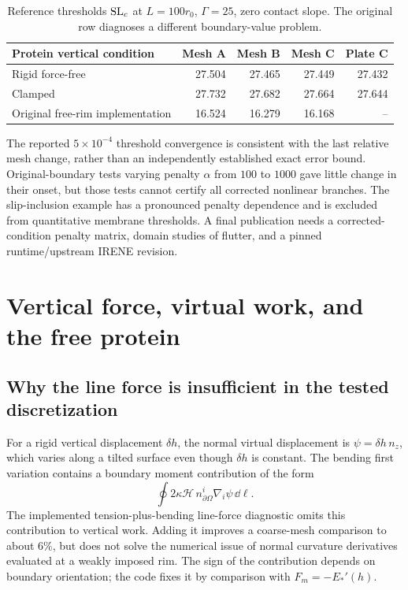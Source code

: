 \begin{table}[h]\centering\small
\begin{tabular}{lrrrr}\toprule Protein vertical condition & Mesh A & Mesh B & Mesh C & Plate C\\\midrule
Rigid force-free &27.504&27.465&27.449&27.432\\
Clamped &27.732&27.682&27.664&27.644\\
Original free-rim implementation &16.524&16.279&16.168&--\\\bottomrule
\end{tabular}
\caption{Reference thresholds $\mathrm{SL}_c$ at $L=100r_0$, $\Gamma=25$, zero contact slope. The original row diagnoses a different boundary-value problem.}
\end{table}
The reported $5\times10^{-4}$ threshold convergence is consistent with the last relative mesh change, rather than an independently established exact error bound. Original-boundary tests varying penalty $\alpha$ from $100$ to $1000$ gave little change in their onset, but those tests cannot certify all corrected nonlinear branches. The slip-inclusion  example has a pronounced penalty dependence and is excluded from quantitative membrane thresholds. A final publication needs a corrected-condition penalty matrix, domain studies of flutter, and a pinned runtime/upstream IRENE revision.

\section{Vertical force, virtual work, and the free protein}
\subsection{Why the line force is insufficient in the tested discretization}
For a rigid vertical displacement $\delta h$, the normal virtual displacement is $\psi=\delta h\,n_z$, which varies along a tilted surface even though $\delta h$ is constant. The bending first variation contains a boundary moment contribution of the form
\begin{equation}
\oint 2\kappa\mathcal H\,n^i_{\partial\Omega}\nabla_i\psi\,\dd\ell.
\end{equation}
The implemented tension-plus-bending line-force diagnostic omits this contribution to vertical work. Adding it improves a coarse-mesh comparison to about $6\%$, but does not solve the numerical issue of normal curvature derivatives evaluated at a weakly imposed rim. The sign of the contribution depends on boundary orientation; the code fixes it by comparison with $F_m=-E_*'(h)$.

